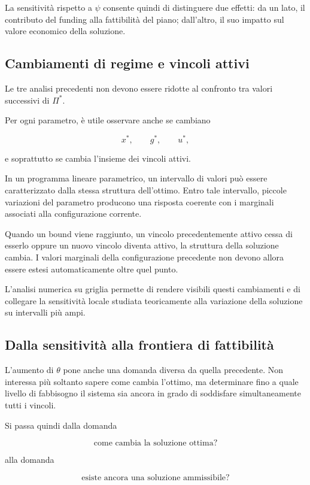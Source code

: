 La sensitivit\`a rispetto a $\psi$ consente quindi di distinguere due effetti: da un lato, il contributo del funding alla fattibilit\`a del piano; dall'altro, il suo impatto sul valore economico della soluzione.

\subsection{Cambiamenti di regime e vincoli attivi}

Le tre analisi precedenti non devono essere ridotte al confronto tra valori
successivi di $\Pi^*$.

Per ogni parametro, \`e utile osservare anche se cambiano

\[
x^*,
\qquad
g^*,
\qquad
u^*,
\]

\noindent e soprattutto se cambia l'insieme dei vincoli attivi.

In un programma lineare parametrico, un intervallo di valori pu\`o essere
caratterizzato dalla stessa struttura dell'ottimo. Entro tale intervallo,
piccole variazioni del parametro producono una risposta coerente con i
marginali associati alla configurazione corrente.

Quando un bound viene raggiunto, un vincolo precedentemente attivo cessa di
esserlo oppure un nuovo vincolo diventa attivo, la struttura della
soluzione cambia. I valori marginali della configurazione precedente non
devono allora essere estesi automaticamente oltre quel punto.

L'analisi numerica su griglia permette di rendere visibili questi cambiamenti
e di collegare la sensitivit\`a locale studiata teoricamente alla variazione
della soluzione su intervalli pi\`u ampi.

\subsection{Dalla sensitivit\`a alla frontiera di fattibilit\`a}

L'aumento di $\theta$ pone anche una domanda diversa da quella precedente.
Non interessa pi\`u soltanto sapere come cambia l'ottimo, ma determinare fino
a quale livello di fabbisogno il sistema sia ancora in grado di soddisfare
simultaneamente tutti i vincoli.

Si passa quindi dalla domanda

\[
\text{come cambia la soluzione ottima?}
\]

\noindent alla domanda

\[
\text{esiste ancora una soluzione ammissibile?}
\]

